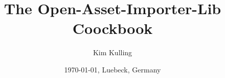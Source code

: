 \title{The Open-Asset-Importer-Lib Coockbook}
\author{Kim Kulling}
\date{\today{}, Luebeck, Germany}
